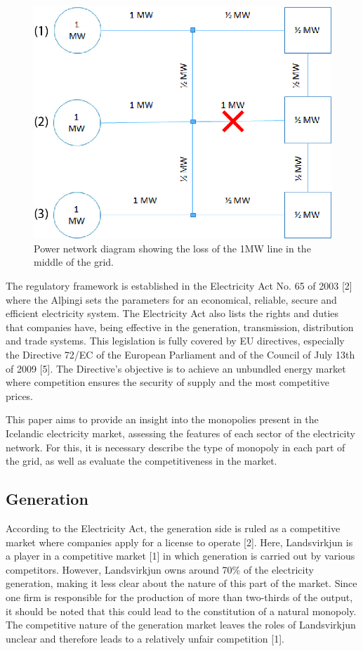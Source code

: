 \documentclass[svn, final]{rureport}
\begin{document}
\begin{figure}[h!]
    \centering
    \includegraphics[width=0.6\linewidth]{N-1.jpg}
    \caption{Power network diagram showing the loss of the 1MW line in the middle of the grid.}
    \label{fig:N-1}
\end{figure}

The regulatory framework is established in the Electricity Act No. 65 of 2003 [2] where the Alþingi sets the parameters for an economical, reliable, secure and efficient electricity system. The Electricity Act also lists the rights and duties that companies have, being effective in the generation, transmission, distribution and trade systems. This legislation is fully covered by EU directives, especially the Directive 72/EC of the European Parliament and of the Council of July 13th of 2009 [5]. The Directive’s objective is to achieve an unbundled energy market where competition ensures the security of supply and the most competitive prices. 

This paper aims to provide an insight into the monopolies present in the Icelandic electricity market, assessing the features of each sector of the electricity network. For this, it is necessary describe the type of monopoly in each part of the grid, as well as evaluate the competitiveness in the market. 

\subsection{Generation}

According to the Electricity Act, the generation side is ruled as a competitive market where companies apply for a license to operate [2]. Here, Landsvirkjun is a player in a competitive market [1] in which generation is carried out by various competitors. However, Landsvirkjun owns around 70\% of the electricity generation, making it less clear about the nature of this part of the market. Since one firm is responsible for the production of more than two-thirds of the output, it should be noted that this could lead to the constitution of a natural monopoly. The competitive nature of the generation market leaves the roles of Landsvirkjun unclear and therefore leads to a relatively unfair competition [1].
\end{document}
